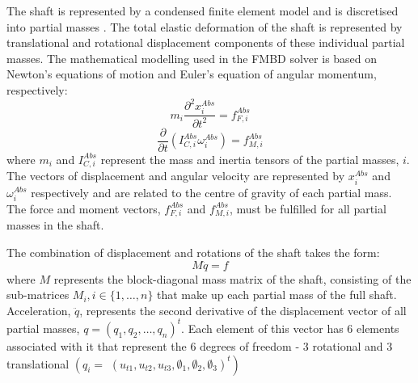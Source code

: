 The shaft is represented by a condensed finite element model and is discretised into partial masses \cite{Parikyan2001}. The total elastic deformation of the shaft is represented by translational and rotational displacement components of these individual partial masses. The mathematical modelling used in the FMBD solver is based on Newton’s equations of motion and Euler’s equation of angular momentum, respectively:
\begin{equation}\label{NewtonFMBD}
	m_i \frac{\partial^2 x_i^{A b s}}{\partial t^2}=f_{F, i}^{A b s}
\end{equation}
\begin{equation}\label{EulerFMBD}
	\frac{\partial}{\partial t}\left(I_{C, i}^{A b s} \omega_i^{A b s}\right)=f_{M, i}^{A b s}
\end{equation}
where $m_i$ and $I_{C, i}^{A b s}$ represent the mass and inertia tensors of the partial masses, $i$. The vectors of displacement and angular velocity are represented by $x_i^{A b s}$ and $\omega_i^{A b s}$ respectively and are related to the centre of gravity of each partial mass. The force and moment vectors, $f_{F, i}^{A b s}$ and $f_{M, i}^{A b s}$, must be fulfilled for all partial masses in the shaft.

The combination of displacement and rotations of the shaft takes the form:
\begin{equation}\label{ShaftEquilibrium}
	M \ddot{q}=f
\end{equation}
where $M$ represents the block-diagonal mass matrix of the shaft, consisting of the sub-matrices $M_i, i \in\{1, \ldots, n\}$ that make up each partial mass of the full shaft. Acceleration, $\ddot{q}$, represents the second derivative of the displacement vector of all partial masses, $q=\left(q_1, q_2, \ldots, q_n\right)^t$. Each element of this vector has 6 elements associated with it that represent the 6 degrees of freedom - 3 rotational and 3 translational $\left(q_i=\right.$ $\left.\left(u_{t 1}, u_{t 2}, u_{t 3}, \emptyset_1, \emptyset_2, \emptyset_3\right)^t\right)$

